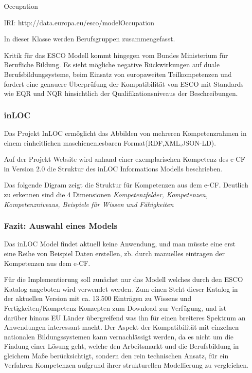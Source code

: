 Occupation 

IRI: http://data.europa.eu/esco/modelOccupation

In dieser Klasse werden Berufsgruppen zusammengefasst.

Kritik für das ESCO Modell kommt hingegen vom Bundes Ministerium für Berufliche Bildung. Es sieht mögliche negative Rückwirkungen auf duale Berufsbildungsysteme, beim Einsatz von europaweiten Teilkompetenzen und fordert eine genauere Überprüfung der Kompatibilität von ESCO mit Standards wie EQR und NQR hinsichtlich der Qualifikationsniveaus der Beschreibungen. 



\subsubsection{inLOC}

Das Projekt InLOC ermöglicht das Abbilden von mehreren Kompetenzrahmen in einem einheitlichen maschienenlesbaren Format(RDF,XML,JSON-LD). 

Auf der Projekt Website wird anhand einer exemplarischen Kompetenz des e-CF in Version 2.0 die Struktur des inLOC Informations Modells beschrieben. 

Das folgende Digram zeigt die Struktur für Kompetenzen aus dem e-CF.
 Deutlich zu erkennen sind die 4 Dimensionen \textit{Kompetenzfelder, Kompetenzen, Kompetenzniveaus, Beispiele für Wissen und Fähigkeiten}
 
 \subsubsection{Fazit: Auswahl eines Models}
 
  Das inLOC Model findet aktuell keine Anwendung, und man müsste eine erst eine Reihe von Beispiel Daten erstellen, zb. durch manuelles eintragen der Kompetenzen aus dem e-CF. 
 
 Für die Implementierung soll zunächst nur das Modell welches durch den ESCO Katalog angeboten wird verwendet werden. Zum einen Steht dieser Katalog in der aktuellen Version mit ca. 13.500 Einträgen zu Wissens und Fertigkeiten/Kompetenz Konzepten zum Download zur Verfügung, und ist darüber hinaus EU Länder übergreifend was ihn für einen breiteres Spektrum an Anwendungen interessant macht. 
 Der Aspekt der Kompatibilität mit einzelnen nationalen Bildungssystemen kann vernachlässigt werden, da es nicht um die Findung einer Lösung geht, welche den Arbeitsmarkt und die Berufsbildung in gleichem Maße berücksichtigt, sondern den rein technischen Ansatz, für ein Verfahren Kompetenzen aufgrund ihrer strukturellen Modellierung zu vergleichen. 
 


